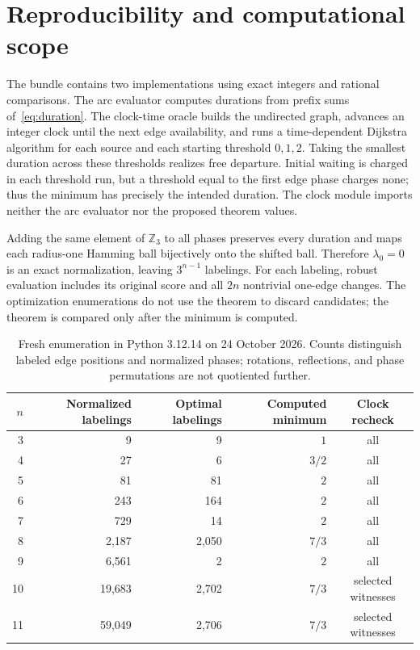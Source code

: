 \documentclass[11pt,a4paper]{article}
\newcommand{\Z}{\mathbb Z}
\begin{document}
\section{Reproducibility and computational scope}
The bundle contains two implementations using exact integers and rational comparisons. The arc evaluator computes durations from prefix sums of~\eqref{eq:duration}. The clock-time oracle builds the undirected graph, advances an integer clock until the next edge availability, and runs a time-dependent Dijkstra algorithm for each source and each starting threshold $0,1,2$. Taking the smallest duration across these thresholds realizes free departure. Initial waiting is charged in each threshold run, but a threshold equal to the first edge phase charges none; thus the minimum has precisely the intended duration. The clock module imports neither the arc evaluator nor the proposed theorem values.

Adding the same element of $\Z_3$ to all phases preserves every duration and maps each radius-one Hamming ball bijectively onto the shifted ball. Therefore $\lambda_0=0$ is an exact normalization, leaving $3^{n-1}$ labelings. For each labeling, robust evaluation includes its original score and all $2n$ nontrivial one-edge changes. The optimization enumerations do not use the theorem to discard candidates; the theorem is compared only after the minimum is computed.

\begin{table}[ht]
\centering
\begin{tabular}{rrrrc}
\toprule
$n$ & Normalized labelings & Optimal labelings & Computed minimum & Clock recheck\\
\midrule
3 & 9 & 9 & $1$ & all\\
4 & 27 & 6 & $3/2$ & all\\
5 & 81 & 81 & $2$ & all\\
6 & 243 & 164 & $2$ & all\\
7 & 729 & 14 & $2$ & all\\
8 & 2,187 & 2,050 & $7/3$ & all\\
9 & 6,561 & 2 & $2$ & all\\
10 & 19,683 & 2,702 & $7/3$ & selected witnesses\\
11 & 59,049 & 2,706 & $7/3$ & selected witnesses\\
\bottomrule
\end{tabular}
\caption{Fresh enumeration in Python 3.12.14 on 24 October 2026. Counts distinguish labeled edge positions and normalized phases; rotations, reflections, and phase permutations are not quotiented further.}\label{tab:enum}
\end{table}
\end{document}
